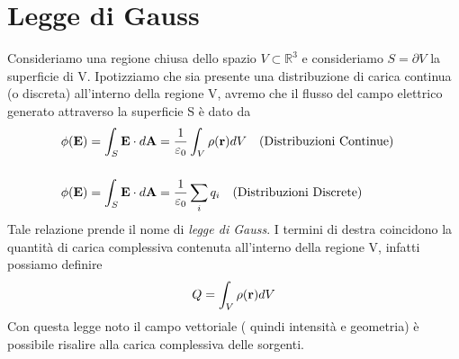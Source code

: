 \section{Legge di Gauss}

Consideriamo una regione chiusa dello spazio $ V \subset \mathbb{R}^3$ e consideriamo $S = \partial V$ la superficie di V.  Ipotizziamo che sia presente una distribuzione di carica continua (o discreta) all'interno della regione V, avremo che il flusso del campo elettrico generato attraverso la superficie S \`e dato da 
\begin{equation*}
\begin{aligned}
	& \phi(\bold{E}) = \int_{S} \bold{E} \cdot d\bold{A} = \frac{1}{\varepsilon_0}\int_{V} \rho(\bold{r})dV \quad \text{(Distribuzioni Continue)} & \\[0.5cm]
	& \phi(\bold{E}) = \int_{S} \bold{E} \cdot d \bold{A} = \frac{1}{\varepsilon_0} \sum_{i}q_i
	\quad \text{(Distribuzioni Discrete)}
\end{aligned}
\end{equation*}
Tale relazione prende il nome di \textit{legge di Gauss}. I termini di destra coincidono la quantit\`a di carica complessiva contenuta all'interno della regione V, infatti possiamo definire
\begin{equation*}
	Q = \int_{V} \rho(\bold{r})dV
\end{equation*} 
Con questa legge noto il campo vettoriale ( quindi intensit\`a e geometria) \`e possibile risalire alla carica complessiva delle sorgenti.
\\

